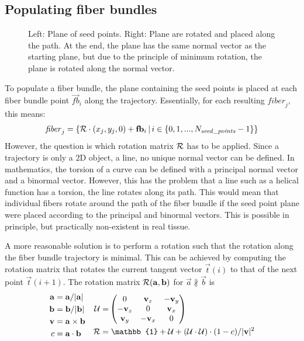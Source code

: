 \subsection{Populating fiber bundles}\label{sec:fillBundle}
%
\begin{figure}[!t]
    \centering
    \setlength{\tikzwidth}{0.75\textwidth}
	\caption{Left: Plane of seed points. Right: Plane are rotated and placed along the path. At the end, the plane has the same normal vector as the starting plane, but due to the principle of minimum rotation, the plane is rotated along the normal vector.}
	\label{fig:torsion}
\end{figure}
%
To populate a fiber bundle, the plane containing the seed points is placed at each fiber bundle point $\vec{fb}_i$ along the trajectory.
Essentially, for each resulting $\mathit{fiber}_j$, this means:
% 
\begin{align}
    \mathit{fiber}_j = \left\{ \mathcal{R} \cdot (x_j, y_j, 0) + \mathbf{fb}_i \, | \, i \in \{0,1,...,N_{\mathit{seed\_points}}-1\}\right\}
\end{align}
% 
However, the question is which rotation matrix $\mathcal{R}$ has to be applied.
Since a trajectory is only a 2D object, \ie{} a line, no unique normal vector can be defined.
In mathematics, the torsion of a curve can be defined with a principal normal vector and a binormal vector.
However, this has the problem that a line such as a helical function has a torsion, \ie{} the line rotates along its path.
This would mean that  individual fibers rotate around the path of the fiber bundle if the seed point plane were placed according to the principal and binormal vectors.
This is possible in principle, but practically non-existent in real tissue.
\par
% 
A more reasonable solution is to perform a rotation such that the rotation along the fiber bundle trajectory is minimal.
This can be achieved by computing the rotation matrix that rotates the current tangent vector $\vec{t}(i)$ to that of the next point $\vec{t}(i+1)$.
The rotation matrix $\mathcal{R}(\mathbf{a}, \mathbf{b})$ for $\vec{a} \nparallel \vec{b}$ is
\begin{align}
\begin{split}
    \vec{a} =& \; \vec{a} / |\vec{a}|\\
    \vec{b} =& \; \vec{b} / |\vec{b}|\\
    \vec{v} =& \; \vec{a} \times \vec{b}\\
    c =& \; \vec{a} \cdot \vec{b}
\end{split}
\quad
\begin{split}
    \mat{U} =& \begin{pmatrix} 0 & \vec{v}_z & -\vec{v}_y\\ -\vec{v}_z & 0 & \vec{v}_x\\ \vec{v}_y & -\vec{v}_x & 0\end{pmatrix}\\
    \mat{R} =& \; \mathbb{1} + \mat{U} + (\mat{U} \cdot \mat{U}) \cdot (1 - c) / |\vec{v}|^2
\end{split}
\end{align}
